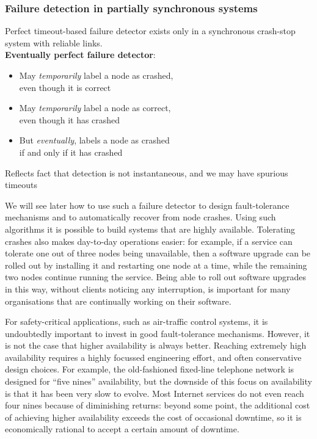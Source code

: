 \begin{frame}
    \label{s:eventual-detector}
    \frametitle{Failure detection in partially synchronous systems}
    Perfect timeout-based failure detector exists only in a synchronous crash-stop system with reliable links.\\[1em]
    \textbf{Eventually perfect failure detector}:
    \begin{itemize}
        \item May \emph{temporarily} label a node as crashed,\\ even though it is correct
        \item May \emph{temporarily} label a node as correct,\\ even though it has crashed
        \item But \emph{eventually}, labels a node as crashed\\ if and only if it has crashed\\[1em]
    \end{itemize}
    Reflects fact that detection is not instantaneous, and we may have spurious timeouts
\end{frame}
\label{l:eventual-detector}

We will see later how to use such a failure detector to design fault-tolerance mechanisms and to automatically recover from node crashes.
Using such algorithms it is possible to build systems that are highly available.
Tolerating crashes also makes day-to-day operations easier: for example, if a service can tolerate one out of three nodes being unavailable, then a software upgrade can be rolled out by installing it and restarting one node at a time, while the remaining two nodes continue running the service.
Being able to roll out software upgrades in this way, without clients noticing any interruption, is important for many organisations that are continually working on their software.


For safety-critical applications, such as air-traffic control systems, it is undoubtedly important to invest in good fault-tolerance mechanisms.
However, it is not the case that higher availability is always better.
Reaching extremely high availability requires a highly focussed engineering effort, and often conservative design choices.
For example, the old-fashioned fixed-line telephone network is designed for ``five nines'' availability, but the downside of this focus on availability is that it has been very slow to evolve.
Most Internet services do not even reach four nines because of diminishing returns: beyond some point, the additional cost of achieving higher availability exceeds the cost of occasional downtime, so it is economically rational to accept a certain amount of downtime.

